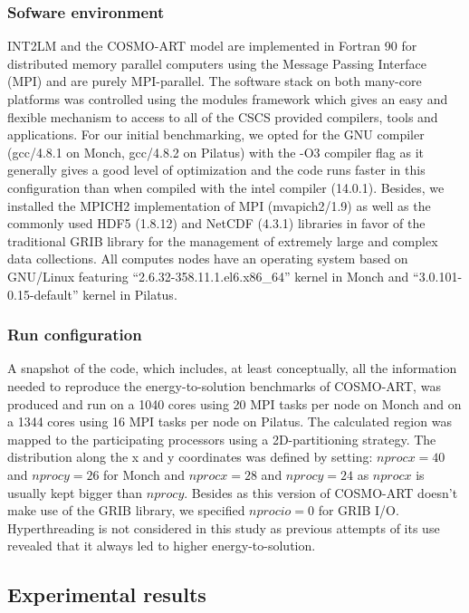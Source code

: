  
\subsubsection{Sofware environment}
INT2LM  and the  COSMO-ART model  are  implemented in  Fortran 90  for
distributed  memory  parallel  computers  using  the  Message  Passing
Interface (MPI)  and are purely  MPI-parallel.  The software  stack on
both many-core  platforms was  controlled using the  modules framework
which gives  an easy and  flexible mechanism to  access to all  of the
CSCS  provided compilers,  tools  and applications.   For our  initial
benchmarking,  we opted  for  the GNU  compiler  (gcc/4.8.1 on  Monch,
gcc/4.8.2 on Pilatus) with the -O3 compiler flag as it generally gives
a  good  level  of optimization  and  the  code  runs faster  in  this
configuration  than when  compiled with  the intel  compiler (14.0.1).
Besides, we installed the  MPICH2 implementation of MPI (mvapich2/1.9)
as  well  as  the  commonly  used HDF5  (1.8.12)  and  NetCDF  (4.3.1)
libraries in favor of the  traditional GRIB library for the management
of extremely  large and complex data collections.   All computes nodes
have    an   operating   system    based   on    GNU/Linux   featuring
``2.6.32-358.11.1.el6.x86\_64''      kernel      in     Monch      and
``3.0.101-0.15-default'' kernel in Pilatus.

\subsubsection{Run configuration}
A snapshot of the code, which includes, at least conceptually, all the
information needed  to reproduce the  energy-to-solution benchmarks of
COSMO-ART, was produced and run on a 1040 cores using 20 MPI tasks per
node on  Monch and  on a  1344 cores using  16 MPI  tasks per  node on
Pilatus.   The  calculated  region  was mapped  to  the  participating
processors using  a 2D-partitioning strategy.   The distribution along
the  x and  y  coordinates  was defined  by  setting: $nprocx=40$  and
$nprocy=26$ for  Monch and $nprocx=28$ and $nprocy=24$  as $nprocx$ is
usually  kept  bigger  than  $nprocy$.   Besides as  this  version  of
COSMO-ART  doesn't  make  use   of  the  GRIB  library,  we  specified
$nprocio=0$ for  GRIB I/O.  Hyperthreading  is not considered  in this
study as previous  attempts of its use revealed that  it always led to
higher energy-to-solution.\\

\subsection{Experimental results}
\label{subsec:4.3}

